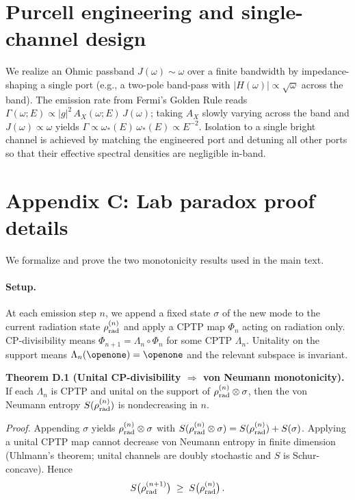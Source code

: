 \documentclass[aps,prx,onecolumn,showpacs,superscriptaddress,longbibliography,nofootinbib]{revtex4-2}
\begin{document}
\section{Purcell engineering and single-channel design}
We realize an Ohmic passband $J(\omega)\sim \omega$ over a finite bandwidth by impedance-shaping a single port (e.g., a two-pole band-pass with $|H(\omega)|\propto \sqrt{\omega}$ across the band). The emission rate from Fermi’s Golden Rule reads $\Gamma(\omega;E)\propto |g|^2\,A_X(\omega;E)\,J(\omega)$; taking $A_X$ slowly varying across the band and $J(\omega)\propto\omega$ yields $\Gamma\propto \omega_\ast(E)\,\omega_\ast(E)\propto E^{-2}$. Isolation to a single bright channel is achieved by matching the engineered port and detuning all other ports so that their effective spectral densities are negligible in-band.

\section{Appendix C: Lab paradox proof details}
We formalize and prove the two monotonicity results used in the main text.

\paragraph*{Setup.} At each emission step $n$, we append a fixed state $\sigma$ of the new mode to the current radiation state $\rho_{\rm rad}^{(n)}$ and apply a CPTP map $\Phi_n$ acting on radiation only. CP-divisibility means $\Phi_{n+1}=\Lambda_n\circ \Phi_n$ for some CPTP $\Lambda_n$. Unitality on the support means $\Lambda_n(\openone)=\openone$ and the relevant subspace is invariant.

\noindent\textbf{Theorem D.1 (Unital CP-divisibility $\Rightarrow$ von Neumann monotonicity).} If each $\Lambda_n$ is CPTP and unital on the support of $\rho_{\rm rad}^{(n)}\otimes\sigma$, then the von Neumann entropy $S(\rho_{\rm rad}^{(n)})$ is nondecreasing in $n$.

\emph{Proof.} Appending $\sigma$ yields $\rho_{\rm rad}^{(n)}\otimes\sigma$ with $S(\rho_{\rm rad}^{(n)}\otimes\sigma)=S(\rho_{\rm rad}^{(n)})+S(\sigma)$. Applying a unital CPTP map cannot decrease von Neumann entropy in finite dimension (Uhlmann’s theorem; unital channels are doubly stochastic and $S$ is Schur-concave). Hence
\begin{equation}
 S\big(\rho_{\rm rad}^{(n+1)}\big)\;\ge\; S\big(\rho_{\rm rad}^{(n)}\big)\,.
\end{equation}
\end{document}
